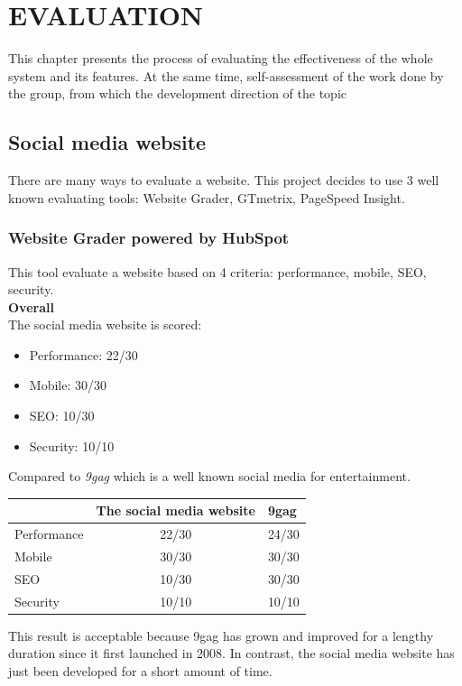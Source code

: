 \chapter{EVALUATION}
This chapter presents the process of evaluating the effectiveness of the whole system and its features. At the same time, self-assessment of the work done by the group, from which the development direction of the topic
\section{Social media website}
There are many ways to evaluate a website. This project decides to use 3 well known evaluating tools: Website Grader, GTmetrix, PageSpeed Insight.
\subsection{Website Grader powered by HubSpot}
This tool evaluate a website based on 4 criteria: performance, mobile, SEO, security.\\
\textbf{Overall}\\
The social media website is scored:
\begin{itemize}
\item Performance: 22/30
\item Mobile: 30/30
\item SEO: 10/30
\item Security: 10/10
\end{itemize}
Compared to \textit{9gag} which is a well known social media for entertainment. 
\begin{table}[H]
\begin{tabular}{|l|c|l|}
\hline
            & \multicolumn{1}{l|}{The social media website} & 9gag  \\ \hline
Performance & 22/30                                         & 24/30 \\ \hline
Mobile      & 30/30                                         & 30/30 \\ \hline
SEO         & 10/30                                         & 30/30 \\ \hline
Security    & 10/10                                         & 10/10 \\ \hline
\end{tabular}
\end{table}
This result is acceptable because 9gag has grown and improved for a lengthy duration since it first launched in 2008. In contrast, the social media website has just been developed for a short amount of time.\\
